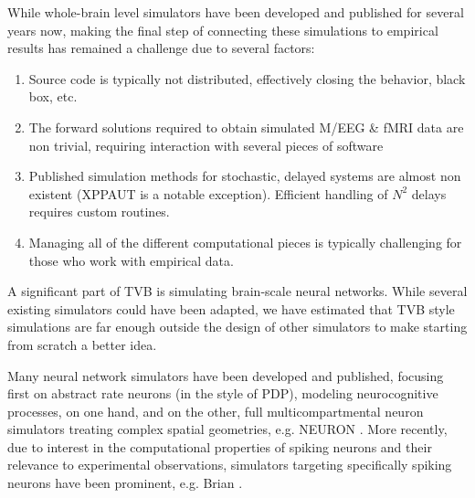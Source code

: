 While whole-brain level simulators have been developed and published for
several years now, making the final step of connecting these simulations to
empirical results has remained a challenge due to several factors:

\begin{enumerate}

	\item Source code is typically not distributed, effectively closing
        the behavior, black box, etc.  

	\item The forward solutions required to obtain simulated M/EEG \& fMRI
	data are non trivial, requiring interaction with several pieces of software

	\item Published simulation methods for stochastic, delayed systems 
		are almost non existent (XPPAUT \cite{XPPAUT} is a notable exception).
		Efficient handling of $N^2$ delays requires custom routines.

	\item Managing all of the different computational pieces is typically
	challenging for those who work with empirical data.

\end{enumerate}

A significant part of TVB is simulating brain-scale neural networks. While
several existing simulators could have been adapted, we have estimated that
TVB style simulations are far enough outside the design of other simulators to
make starting from scratch a better idea.

Many neural network simulators have been developed and published, focusing
first on abstract rate neurons (in the style of PDP), modeling neurocognitive
processes, on one hand, and on the other, full multicompartmental neuron
simulators treating complex spatial geometries, e.g. NEURON \cite{Hines_2001}.
More recently, due to interest in the computational properties of spiking 
neurons and their relevance to experimental observations, simulators targeting
specifically spiking neurons have been prominent, e.g. Brian 
\cite{Goodman_2009}.

